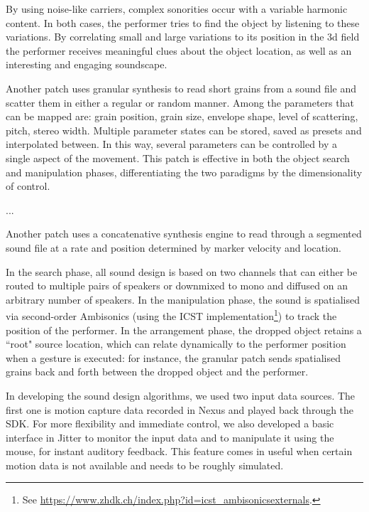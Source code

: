 \documentclass{nime-alternate}
\begin{document}
By using noise-like carriers, complex sonorities occur with a variable harmonic content. In both cases, the performer tries to find the object by listening to these variations. By correlating small and large variations to its position in the 3d field the performer receives meaningful clues about the object location, as well as an interesting and engaging soundscape. 

Another patch uses granular synthesis to
read short grains from a sound file and scatter them in either a regular or random manner. Among the parameters that can be mapped are: grain position, grain size, envelope shape, level of scattering, pitch, stereo width. Multiple parameter states can be stored, saved as presets and interpolated between. In this way, several parameters can be controlled by a single aspect of the movement. This patch is effective in both the object search and manipulation phases, differentiating the two paradigms by the dimensionality of control.

...

Another patch uses a concatenative synthesis engine to read through a segmented sound file at a rate and position determined by marker velocity and location.

In the search phase, all sound design is based on two channels that can either be routed to multiple pairs of speakers or downmixed to mono and diffused on an arbitrary number of speakers. In the manipulation phase, the sound is spatialised via second-order Ambisonics (using the ICST implementation\footnote{See \url{https://www.zhdk.ch/index.php?id=icst_ambisonicsexternals}.}) to track the position of the performer. In the arrangement phase, the dropped object retains a ``root" source location, which can relate dynamically to the performer position when a gesture is executed: for instance, the granular patch sends spatialised grains back and forth between the dropped object and the performer.

In developing the sound design algorithms, we used two input data sources. The first one is motion capture data recorded in Nexus and played back through the SDK. For more flexibility and immediate control, we also developed a basic interface in Jitter to monitor the input data and to manipulate it using the mouse, for instant auditory feedback. This feature comes in useful when certain motion data is not available and needs to be roughly simulated.
\end{document}
